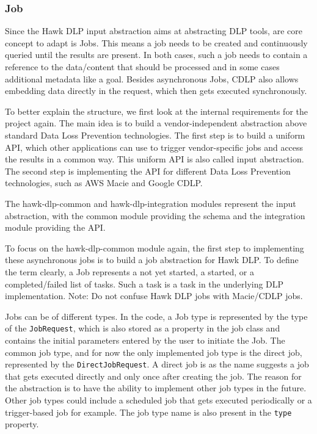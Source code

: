 \subsubsection{Job}
Since the Hawk DLP input abstraction aims at abstracting DLP tools, are core concept to adapt is Jobs.
This means a job needs to be created and continuously queried until the results are present. In both cases, such a job needs to contain a reference to the data/content that should be processed and in some cases additional metadata like a goal. Besides asynchronous Jobs,
CDLP also allows embedding data directly in the request, which then gets executed synchronously.

To better explain the structure, we first look at the internal requirements for the project again. The main idea is to build a vendor-independent abstraction above standard Data Loss Prevention technologies. The first step is to build a uniform API, which other applications can use to trigger vendor-specific jobs and access the results in a common way. This uniform API is also called input abstraction. The second step is implementing the API for different Data Loss Prevention technologies, such as AWS Macie and Google CDLP.

The hawk-dlp-common and hawk-dlp-integration modules represent the input abstraction, with the common module providing the schema and the integration module providing the API.

To focus on the hawk-dlp-common module again, the first step to implementing these asynchronous jobs is to build a job abstraction for Hawk DLP. To define the term clearly, a Job represents a not yet started, a started, or a completed/failed list of tasks. Such a task is a task in the underlying DLP implementation. Note: Do not confuse Hawk DLP jobs with Macie/CDLP jobs.

Jobs can be of different types. In the code, a Job type is represented by the type of the \texttt{JobRequest}, which is also stored as a property in the job class and contains the initial parameters entered by the user to initiate the Job. The common job type, and for now the only implemented job type is the direct job, represented by the \texttt{DirectJobRequest}. A direct job is as the name suggests a job that gets executed directly and only once after creating the job. The reason for the abstraction is to have the ability to implement other job types in the future. Other job types could include a scheduled job that gets executed periodically or a trigger-based job for example. The job type name is also present in the \texttt{type} property.

